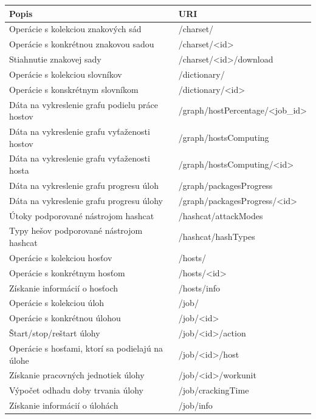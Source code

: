 \documentclass[slovak]{fitthesis}
\begin{document}
\begin{table}[h]
  \begin{center}
        \begin{tabular}{ |p{8cm}|p{7.4cm}|  }
         \hline
         Popis& URI\\
         \hline
          Operácie s kolekciou znakových sád & /charset/ \\
          Operácie s konkrétnou znakovou sadou & /charset/<id> \\
          Stiahnutie znakovej sady & /charset/<id>/download \\
          Operácie s kolekciou slovníkov & /dictionary/ \\
          Operácie s konskrétnym slovníkom & /dictionary/<id> \\
          Dáta na vykreslenie grafu podielu práce hostov & /graph/hostPercentage/<job\_id> \\
          Dáta na vykreslenie grafu vyťaženosti hostov & /graph/hostsComputing \\
          Dáta na vykreslenie grafu vyťaženosti hosta & /graph/hostsComputing/<id> \\
          Dáta na vykreslenie grafu progresu úloh & /graph/packagesProgress \\
          Dáta na vykreslenie grafu progresu úlohy & /graph/packagesProgress/<id> \\
          Útoky podporované nástrojom hashcat & /hashcat/attackModes \\
          Typy hešov podporované nástrojom hashcat & /hashcat/hashTypes \\
          Operácie s kolekciou hosťov & /hosts/ \\
          Operácie s konkrétnym hosťom & /hosts/<id> \\
          Získanie informácií o hosťoch & /hosts/info \\
          Operácie s kolekciou úloh & /job/ \\
          Operácie s konkrétnou úlohou & /job/<id> \\
          Štart/stop/reštart úlohy & /job/<id>/action \\
          Operácie s hosťami, ktorí sa podielajú na úlohe & /job/<id>/host \\
          Získanie pracovných jednotiek úlohy & /job/<id>/workunit \\
          Výpočet odhadu doby trvania úlohy & /job/crackingTime \\
          Získanie informácií o úlohách & /job/info \\

\end{tabular}
\end{center}
\end{table}
\end{document}
